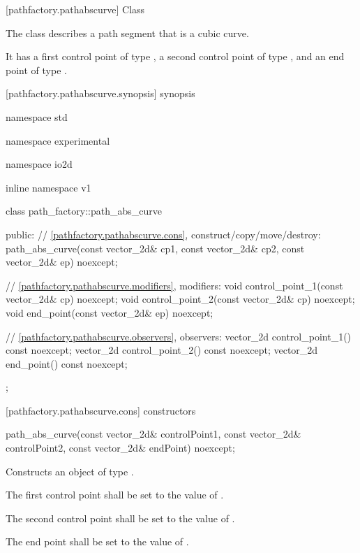  [pathfactory.pathabscurve] {Class }

\pnum
{}
The class  describes a path segment that is a cubic \bezierlocal curve.

\pnum
It has a first control point of type , a second control point of type , and an end point of type .

 [pathfactory.pathabscurve.synopsis] { synopsis}

\begin{codeblock}
namespace std { namespace experimental { namespace io2d { inline namespace v1 {
  class path_factory::path_abs_curve {
  public:
    // \ref{pathfactory.pathabscurve.cons}, construct/copy/move/destroy:
    path_abs_curve(const vector_2d& cp1, const vector_2d& cp2,
      const vector_2d& ep) noexcept;

    // \ref{pathfactory.pathabscurve.modifiers}, modifiers:
    void control_point_1(const vector_2d& cp) noexcept;
    void control_point_2(const vector_2d& cp) noexcept;
    void end_point(const vector_2d& ep) noexcept;


    // \ref{pathfactory.pathabscurve.observers}, observers:
    vector_2d control_point_1() const noexcept;
    vector_2d control_point_2() const noexcept;
    vector_2d end_point() const noexcept;
  };
} } } }
\end{codeblock}

 [pathfactory.pathabscurve.cons] { constructors}

\begin{itemdecl}
    path_abs_curve(const vector_2d& controlPoint1,
      const vector_2d& controlPoint2, const vector_2d& endPoint) noexcept;
\end{itemdecl}
\begin{itemdescr}
	\pnum
	\effects
	Constructs an object of type .
	
	\pnum
	The first control point shall be set to the value of .
	
	\pnum
	The second control point shall be set to the value of .
	
	\pnum
	The end point shall be set to the value of .
\end{itemdescr}

